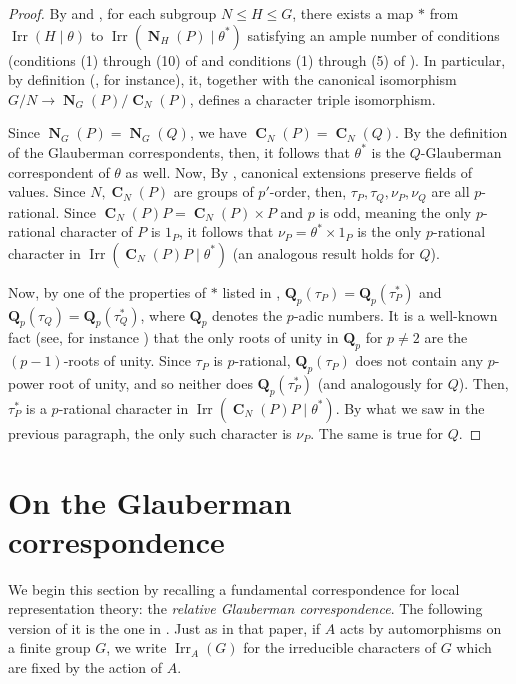 \documentclass[12pt]{amsart}
\DeclareMathOperator{\CB}{\mathbf{C}}
\DeclareMathOperator{\NB}{\mathbf{N}}
\DeclareMathOperator{\Irr}{Irr}
\theoremstyle{remark}
\theoremstyle{definition}
\theoremstyle{plain}
\theoremstyle{definition}
\numberwithin{equation}{section}
\begin{document}
\begin{proof}
	By \cite[Lemma 7.3]{Turull} and \cite[Theorem 7.12]{Turull2}, for each subgroup $N \leq H \leq G$, there exists a map $*$ from $\Irr(H \mid \theta)$ to $\Irr(\NB_H(P) \mid \theta^*)$ satisfying an ample number of conditions (conditions (1) through (10) of \cite[Theorem 7.12]{Turull2} and conditions (1) through (5) of \cite[Lemma 7.3]{Turull}). In particular, by definition (\cite[Definition 11.23]{CTFG}, for instance), it, together with the canonical isomorphism $G/N \to \NB_G(P)/\CB_N(P)$, defines a character triple isomorphism.
	
	Since $\NB_G(P) = \NB_G(Q)$, we have $\CB_N(P) = \CB_N(Q)$. By the definition of the Glauberman correspondents, then, it follows that $\theta^*$ is the $Q$-Glauberman correspondent of $\theta$ as well. Now, By \cite[Corollary 6.4]{CTMcKC}, canonical extensions preserve fields of values. Since $N, \CB_N(P)$ are groups of $p'$-order, then, $\tau_P, \tau_Q, \nu_P, \nu_Q$ are all $p$-rational. Since $\CB_N(P)P = \CB_N(P) \times P$ and $p$ is odd, meaning the only $p$-rational character of $P$ is $1_P$, it follows that $\nu_P = \theta^* \times 1_P$ is the only $p$-rational character in $\Irr(\CB_N(P)P \mid \theta^*)$ (an analogous result holds for $Q$). 
	
	Now, by one of the properties of $*$ listed in \cite[Lemma 7.3]{Turull}, $\mathbf{Q}_p(\tau_P) = \mathbf{Q}_p(\tau_P^*)$ and $\mathbf{Q}_p(\tau_Q) = \mathbf{Q}_p(\tau_Q^*)$, where $\mathbf{Q}_p$ denotes the $p$-adic numbers. It is a well-known fact (see, for instance \cite[Exercise II.3.3]{Janusz}) that the only roots of unity in $\mathbf{Q}_p$ for $p \neq 2$ are the $(p-1)$-roots of unity. Since $\tau_P$ is $p$-rational, $\mathbf{Q}_p(\tau_P)$ does not contain any $p$-power root of unity, and so neither does $\mathbf{Q}_p(\tau_P^*)$ (and analogously for $Q$). Then, $\tau_P^*$ is a $p$-rational character in $\Irr(\CB_N(P)P \mid \theta^*)$. By what we saw in the previous paragraph, the only such character is $\nu_P$. The same is true for $Q$.
\end{proof}

\section{On the Glauberman correspondence}

We begin this section by recalling a fundamental correspondence for local representation theory: the \emph{relative Glauberman correspondence}. The following version of it is the one in \cite{PickyPSolvable}. Just as in that paper, if $A$ acts by automorphisms on a finite group $G$, we write $\Irr_A(G)$ for the irreducible characters of $G$ which are fixed by the action of $A$.
\end{document}
